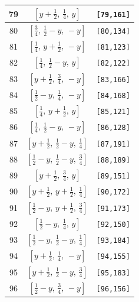 \documentclass[fleqn,8pt]{jsarticle}
\begin{document}
\begin{longtable}{ccc}
79 & $\left[ y + \frac{1}{2},\, \frac{1}{4},\, y \right]$ & {\tt [79,161]} \\ \hline
80 & $\left[ \frac{3}{4},\, \frac{1}{2} - y,\, - y \right]$ & {\tt [80,134]} \\ \hline
81 & $\left[ \frac{1}{4},\, y + \frac{1}{2},\, - y \right]$ & {\tt [81,123]} \\ \hline
82 & $\left[ \frac{1}{4},\, \frac{1}{2} - y,\, y \right]$ & {\tt [82,122]} \\ \hline
83 & $\left[ y + \frac{1}{2},\, \frac{3}{4},\, - y \right]$ & {\tt [83,166]} \\ \hline
84 & $\left[ \frac{1}{2} - y,\, \frac{1}{4},\, - y \right]$ & {\tt [84,168]} \\ \hline
85 & $\left[ \frac{1}{4},\, y + \frac{1}{2},\, y \right]$ & {\tt [85,121]} \\ \hline
86 & $\left[ \frac{1}{4},\, \frac{1}{2} - y,\, - y \right]$ & {\tt [86,128]} \\ \hline
87 & $\left[ y + \frac{1}{2},\, \frac{1}{2} - y,\, \frac{1}{4} \right]$ & {\tt [87,191]} \\ \hline
88 & $\left[ \frac{1}{2} - y,\, \frac{1}{2} - y,\, \frac{3}{4} \right]$ & {\tt [88,189]} \\ \hline
89 & $\left[ y + \frac{1}{2},\, \frac{3}{4},\, y \right]$ & {\tt [89,151]} \\ \hline
90 & $\left[ y + \frac{1}{2},\, y + \frac{1}{2},\, \frac{1}{4} \right]$ & {\tt [90,172]} \\ \hline
91 & $\left[ \frac{1}{2} - y,\, y + \frac{1}{2},\, \frac{3}{4} \right]$ & {\tt [91,173]} \\ \hline
92 & $\left[ \frac{1}{2} - y,\, \frac{1}{4},\, y \right]$ & {\tt [92,150]} \\ \hline
93 & $\left[ \frac{1}{2} - y,\, \frac{1}{2} - y,\, \frac{1}{4} \right]$ & {\tt [93,184]} \\ \hline
94 & $\left[ y + \frac{1}{2},\, \frac{1}{4},\, - y \right]$ & {\tt [94,155]} \\ \hline
95 & $\left[ y + \frac{1}{2},\, \frac{1}{2} - y,\, \frac{3}{4} \right]$ & {\tt [95,183]} \\ \hline
96 & $\left[ \frac{1}{2} - y,\, \frac{3}{4},\, - y \right]$ & {\tt [96,156]} \\
\end{longtable}
\renewcommand{\arraystretch}{1.2}
\end{document}

